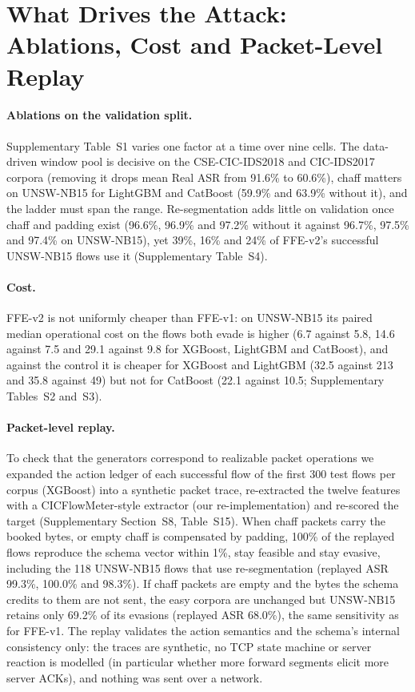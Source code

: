 \section{What Drives the Attack: Ablations, Cost and Packet-Level Replay}
\label{sec:ablation}

\paragraph{Ablations on the validation split.} Supplementary Table~S1 varies one factor at a time over nine cells. The data-driven window pool is decisive on the CSE-CIC-IDS2018 and CIC-IDS2017 corpora (removing it drops mean Real ASR from 91.6\% to 60.6\%), chaff matters on UNSW-NB15 for LightGBM and CatBoost (59.9\% and 63.9\% without it), and the ladder must span the range. Re-segmentation adds little on validation once chaff and padding exist (96.6\%, 96.9\% and 97.2\% without it against 96.7\%, 97.5\% and 97.4\% on UNSW-NB15), yet 39\%, 16\% and 24\% of FFE-v2's successful UNSW-NB15 flows use it (Supplementary Table~S4).

\paragraph{Cost.} FFE-v2 is not uniformly cheaper than FFE-v1: on UNSW-NB15 its paired median operational cost on the flows both evade is higher (6.7 against 5.8, 14.6 against 7.5 and 29.1 against 9.8 for XGBoost, LightGBM and CatBoost), and against the control it is cheaper for XGBoost and LightGBM (32.5 against 213 and 35.8 against 49) but not for CatBoost (22.1 against 10.5; Supplementary Tables~S2 and~S3).

\paragraph{Packet-level replay.} To check that the generators correspond to realizable packet operations we expanded the action ledger of each successful flow of the first 300 test flows per corpus (XGBoost) into a synthetic packet trace, re-extracted the twelve features with a CICFlowMeter-style extractor (our re-implementation) and re-scored the target (Supplementary Section~S8, Table~S15). When chaff packets carry the booked bytes, or empty chaff is compensated by padding, 100\% of the replayed flows reproduce the schema vector within 1\%, stay feasible and stay evasive, including the 118 UNSW-NB15 flows that use re-segmentation (replayed ASR 99.3\%, 100.0\% and 98.3\%). If chaff packets are empty and the bytes the schema credits to them are not sent, the easy corpora are unchanged but UNSW-NB15 retains only 69.2\% of its evasions (replayed ASR 68.0\%), the same sensitivity as for FFE-v1. The replay validates the action semantics and the schema's internal consistency only: the traces are synthetic, no TCP state machine or server reaction is modelled (in particular whether more forward segments elicit more server ACKs), and nothing was sent over a network.
